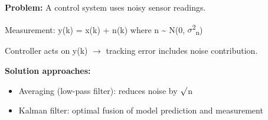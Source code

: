 

\textbf{Problem:} A control system uses noisy sensor readings.

Measurement: y(k) = x(k) + n(k) where n \textasciitilde{} N(0, \ensuremath{\sigma}\textsuperscript{2}\textsubscript{n})

Controller acts on y(k) \ensuremath{\to} tracking error includes noise contribution.

\textbf{Solution approaches:}

\begin{itemize}
\tightlist
\item
  Averaging (low-pass filter): reduces noise by \ensuremath{\surd}n
\item
  Kalman filter: optimal fusion of model prediction and measurement
\end{itemize}


